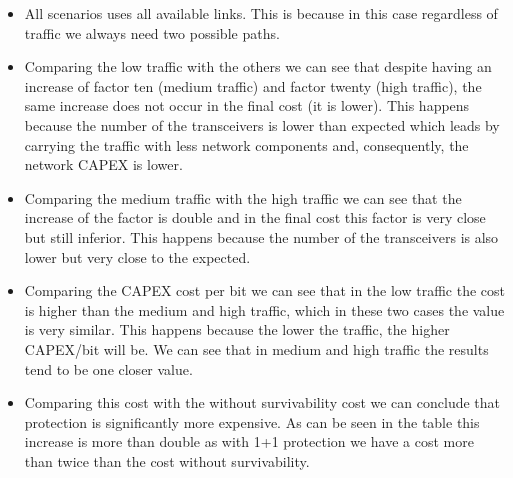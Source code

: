 \begin{itemize}
  \item All scenarios uses all available links. This is because in this case regardless of traffic we always need two possible paths.
  \item Comparing the low traffic with the others we can see that despite having an increase of factor ten (medium traffic) and factor twenty (high traffic), the same increase does not occur in the final cost (it is lower). This happens because the number of the transceivers is lower than expected which leads by carrying the traffic with less network components and, consequently, the network CAPEX is lower.
  \item Comparing the medium traffic with the high traffic we can see that the increase of the factor is double and in the final cost this factor is very close but still inferior. This happens because the number of the transceivers is also lower but very close to the expected.
  \item Comparing the CAPEX cost per bit we can see that in the low traffic the cost is higher than the medium and high traffic, which in these two cases the value is very similar. This happens because the lower the traffic, the higher CAPEX/bit will be. We can see that in medium and high traffic the results tend to be one closer value.
  \item Comparing this cost with the without survivability cost we can conclude that protection is significantly more expensive. As can be seen in the table this increase is more than double as with 1+1 protection we have a cost more than twice than the cost without survivability.
\end{itemize}
